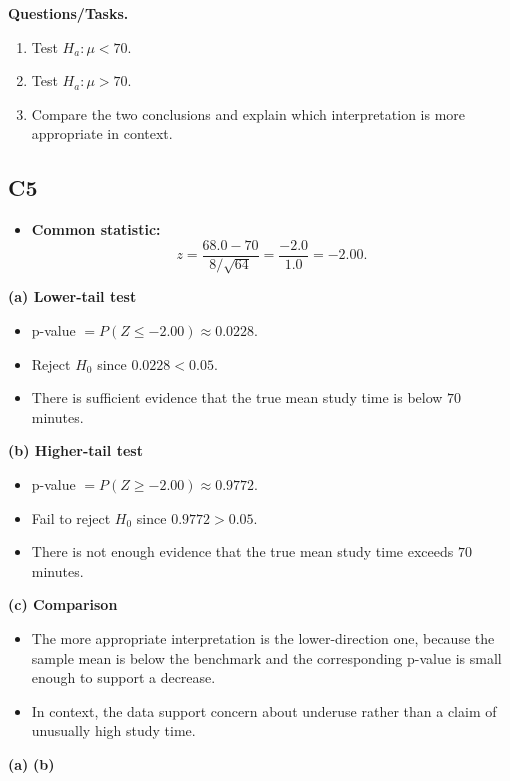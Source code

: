 	\textbf{Questions/Tasks.}
	\begin{enumerate}
		\item[(a)] Test \(H_a:\mu<70\).
		\item[(b)] Test \(H_a:\mu>70\).
		\item[(c)] Compare the two conclusions and explain which interpretation is more appropriate in context.
	\end{enumerate}
	
	\subsection*{C5}
	\begin{itemize}
		\item \textbf{Common statistic:}
		\[
		z=\frac{68.0-70}{8/\sqrt{64}}=\frac{-2.0}{1.0}=-2.00.
		\]
	\end{itemize}
	
	\textbf{(a) Lower-tail test}
	\begin{itemize}
		\item p-value \(=P(Z\le-2.00)\approx0.0228\).
		\item Reject \(H_0\) since \(0.0228<0.05\).
		\item There is sufficient evidence that the true mean study time is below \(70\) minutes.
	\end{itemize}
	
	\textbf{(b) Higher-tail test}
	\begin{itemize}
		\item p-value \(=P(Z\ge-2.00)\approx0.9772\).
		\item Fail to reject \(H_0\) since \(0.9772>0.05\).
		\item There is not enough evidence that the true mean study time exceeds \(70\) minutes.
	\end{itemize}
	
	\textbf{(c) Comparison}
	\begin{itemize}
		\item The more appropriate interpretation is the lower-direction one, because the sample mean is below the benchmark and the corresponding p-value is small enough to support a decrease.
		\item In context, the data support concern about underuse rather than a claim of unusually high study time.
	\end{itemize}
	
	\begin{center}
		\textbf{(a)}\;
		\hspace{0.8cm}
		\textbf{(b)}\;
	\end{center}
	
